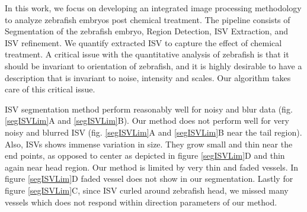 In this work, we focus on developing an integrated image processing methodology to analyze zebrafish embryos post chemical treatment. The pipeline consists of Segmentation of the zebrafish embryo, Region Detection, ISV Extraction, and ISV refinement. We quantify extracted ISV to capture the effect of chemical treatment. A critical issue with the quantitative analysis of zebrafish is that it should be invariant to orientation of zebrafish, and it is highly desirable to have a description that is invariant to noise, intensity
and scales. Our algorithm takes care of this critical issue.

ISV segmentation method perform reasonably well for noisy and blur data (fig. \ref{segISVLim}A and \ref{segISVLim}B). Our method does not perform well for very noisy and blurred ISV (fig. \ref{segISVLim}A and \ref{segISVLim}B near the tail region). Also, ISVs shows immense variation in size. They grow small and thin near the end points, as opposed to center as depicted in figure \ref{segISVLim}D and thin again near head region. Our method is limited by very thin and faded vessels. In figure \ref{segISVLim}D faded vessel does not show in our segmentation. Lastly for figure \ref{segISVLim}C, since ISV curled around zebrafish head, we missed many vessels which does not respond within direction parameters of our method.

